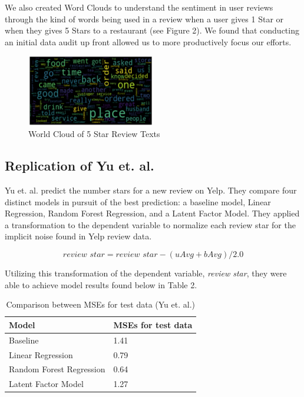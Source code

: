 \documentclass[12pt]{article}
\begin{document}
 We also created Word Clouds to understand the sentiment in user reviews through the kind of
 words being used in a review when a user gives 1 Star or when they gives 5 Stars to a
 restaurant (see Figure 2). We found that conducting an initial data audit up front allowed
 us to more productively focus our efforts.

\begin{figure}[h]
  \caption{World Cloud of 5 Star Review Texts}
  \centering
  \includegraphics[width=0.5\textwidth]{WorldCloud}
\end{figure}

\subsection{Replication of Yu et. al.}

Yu et. al. \cite{yu2015restaurants} predict the number stars for a new review on Yelp.
They compare four distinct models in pursuit of the best prediction: a baseline model,
Linear Regression, Random Forest Regression, and a Latent Factor Model. They applied a
transformation to the dependent variable to normalize each review star for the implicit
noise found in Yelp review data.

\[
\textit{review star} = \textit{review star} - (uAvg + bAvg)/2.0
\]

Utilizing this transformation of the dependent variable, \textit{review star}, they were
able to achieve model results found below in Table 2.

\begin{table}[h]
  \caption{\label{tab:rep-models}Comparison between MSEs for test data (Yu et. al.)}
  \centering
  \begin{tabular}{|l|l|}
    \hline
    \textbf{Model} & \textbf{MSEs for test data} \\
    \hline
    Baseline & 1.41 \\
    \hline
    Linear Regression & 0.79 \\
    \hline
    Random Forest Regression & 0.64 \\
    \hline
    Latent Factor Model & 1.27 \\
    \hline
  \end{tabular}
\end{table}
\end{document}
